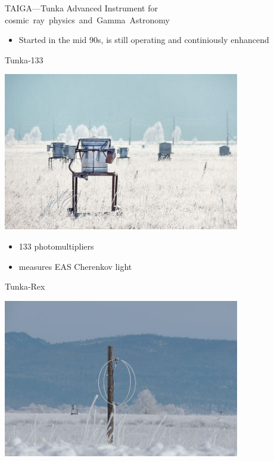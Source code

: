 \begin{frame}{TAIGA---Tunka Advanced Instrument for \mbox{cosmic ray physics and Gamma Astronomy}}
\vspace{-1em}
\begin{itemize}
 \item Started in the mid 90s, is still operating and continiously enhancend
\end{itemize}
\footnotesize
\vspace{-2em}
\begin{minipage}[t]{0.31\textwidth}
  \begin{block}{\small Tunka-133}
    \parbox[c][0.20\textheight][t]{1\textwidth}{
      \centering
      \includegraphics[width=0.7742\textwidth]{pics/Tunka-133.jpg}
    }
    \hfill
    \parbox[c][0.15\textheight][t]{1\textwidth}{
      \begin{itemize}
        \setlength{\itemsep}{0pt}
        \item 133 photomultipliers
        \item measures EAS Cherenkov light
      \end{itemize}
    }
  \end{block}
\end{minipage}
\hfill
\begin{minipage}[t]{0.31\textwidth}
  \begin{block}{\small Tunka-Rex}
    \parbox[c][0.20\textheight][t]{1\textwidth}{
      \centering
      \includegraphics[width=0.7742\textwidth]{pics/Tunka-Rex.jpg}
}
\end{block}
\end{minipage}
\end{frame}
